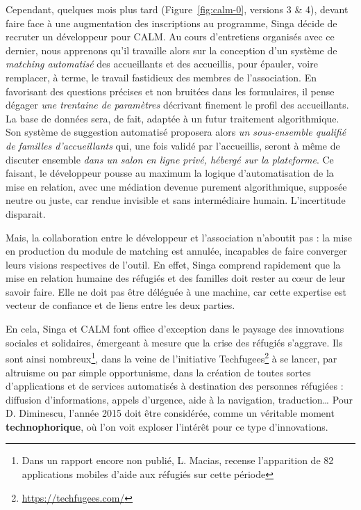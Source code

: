 \documentclass[symmetric,justified,marginals=raggedouter]{tufte-book}
\begin{document}
Cependant, quelques mois plus tard (Figure~\ref{fig:calm-0}, versions 3 \& 4), devant faire face à une augmentation des inscriptions au programme, Singa décide de recruter un dévelop\-peur pour CALM. Au cours d'entre\-tiens organisés avec ce dernier, nous apprenons qu'il travaille alors sur la conception d'un système de \og\textit{matching automatisé}\fg{} des accueillants et des accueillis, pour épauler, voire remplacer, à terme, le travail fastidieux des membres de l'association. En favorisant des questions précises et non bruitées dans les formulaires, il pense dégager \og\textit{une trentaine de paramètres}\fg{} décrivant finement le profil des accueillants. La base de données sera, de fait, adaptée à un futur traitement algorithmique. Son système de suggestion automatisé proposera alors \og\textit{un sous-ensemble qualifié de familles d'accueil\-lants} qui, une fois validé par l'accueillis, seront à même de discuter ensemble \og\textit{dans un salon en ligne privé, hébergé sur la plateforme}\fg{}. Ce faisant, le développeur pousse au maximum la logique d'automatisation de la mise en relation, avec une médiation devenue purement algorithmique, supposée neutre ou juste, car rendue invisible et sans intermédiaire humain. L'incertitude disparait. 

Mais, la collaboration entre le développeur et l'association n'aboutit pas : la mise en production du module de matching est annulée, incapables de faire converger leurs visions respectives de l'outil. En effet, Singa comprend rapidement que la mise en relation humaine des réfugiés et des familles doit rester au cœur de leur savoir faire. Elle ne doit pas être déléguée à une machine, car cette expertise est vecteur de confiance et de liens entre les deux parties. 

En cela, Singa et CALM font office d'exception dans le paysage des innovations sociales et solidaires, émergeant à mesure que la crise des réfugiés s'aggrave. Ils sont ainsi nombreux\footnote{\RaggedOuter Dans un rapport encore non publié, L. Macias, recense l'apparition de 82 applications mobiles d'aide aux réfugiés sur cette période}, dans la veine de l'initiative Techfugees\footnote{\RaggedOuter \url{https://techfugees.com/}} à se lancer, par altruisme ou par simple opportunisme, dans la création de toutes sortes d'applications et de services automatisés à destination des personnes réfugiées : diffusion d'informations, appels d'urgence, aide à la navigation, traduction\ldots{} Pour D. Diminescu, l'année 2015 doit être considérée, comme un véritable moment \textbf{technophorique}, où l'on voit exploser l'intérêt pour ce type d'innovations.
\end{document}

